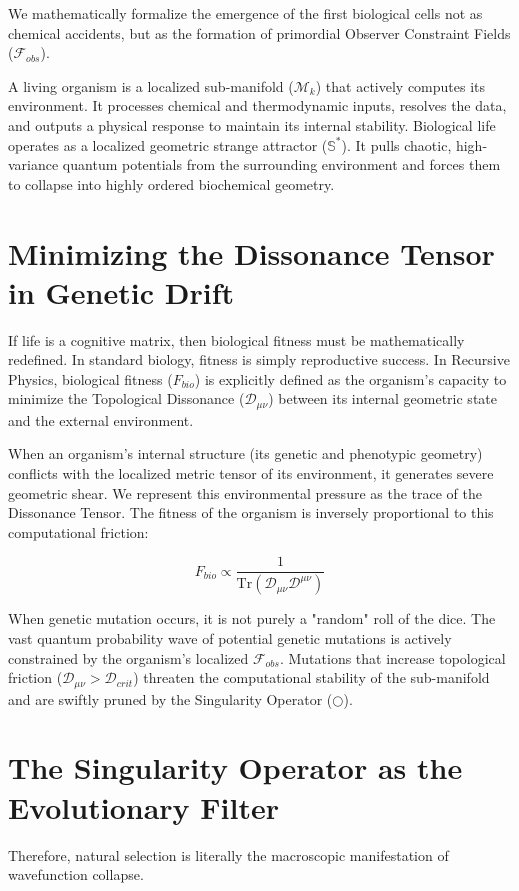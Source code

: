 \documentclass[12pt,openany]{book}
\begin{document}
We mathematically formalize the emergence of the first biological cells not as chemical accidents, but as the formation of primordial Observer Constraint Fields ($\mathcal{F}_{obs}$). 

A living organism is a localized sub-manifold ($\mathcal{M}_k$) that actively computes its environment. It processes chemical and thermodynamic inputs, resolves the data, and outputs a physical response to maintain its internal stability. Biological life operates as a localized geometric strange attractor ($\mathbb{S}^*$). It pulls chaotic, high-variance quantum potentials from the surrounding environment and forces them to collapse into highly ordered biochemical geometry.

\section{Minimizing the Dissonance Tensor in Genetic Drift}
If life is a cognitive matrix, then biological fitness must be mathematically redefined. In standard biology, fitness is simply reproductive success. In Recursive Physics, biological fitness ($F_{bio}$) is explicitly defined as the organism's capacity to minimize the Topological Dissonance ($\mathcal{D}_{\mu\nu}$) between its internal geometric state and the external environment.

When an organism's internal structure (its genetic and phenotypic geometry) conflicts with the localized metric tensor of its environment, it generates severe geometric shear. We represent this environmental pressure as the trace of the Dissonance Tensor. The fitness of the organism is inversely proportional to this computational friction:

\begin{equation}
F_{bio} \propto \frac{1}{\text{Tr}(\mathcal{D}_{\mu\nu}\mathcal{D}^{\mu\nu})}
\end{equation}

When genetic mutation occurs, it is not purely a "random" roll of the dice. The vast quantum probability wave of potential genetic mutations is actively constrained by the organism's localized $\mathcal{F}_{obs}$. Mutations that increase topological friction ($\mathcal{D}_{\mu\nu} > \mathcal{D}_{crit}$) threaten the computational stability of the sub-manifold and are swiftly pruned by the Singularity Operator ($\bigcirc$).

\section{The Singularity Operator as the Evolutionary Filter}
Therefore, natural selection is literally the macroscopic manifestation of wavefunction collapse. 
\end{document}
